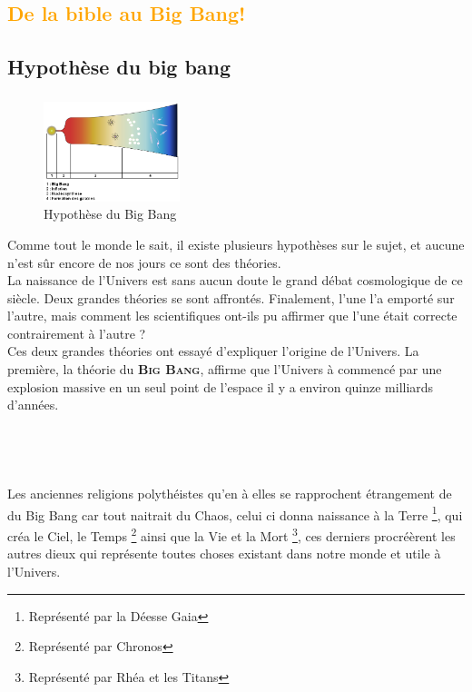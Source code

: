 \textcolor{orange}{\chapter{De la bible au Big Bang!}}
\section{Hypothèse du big bang}
\paragraph{}
	\begin{figure}
	\includegraphics[width=150px]{img3.png}
	\caption{Hypothèse du Big Bang}
\end{figure}
Comme tout le monde le sait, il existe plusieurs hypothèses sur le sujet, 
et aucune n'est sûr encore de nos jours ce sont des théories. \\
La naissance de l'Univers est sans aucun doute le grand débat cosmologique de ce 
siècle. Deux grandes théories se sont affrontés. Finalement, l'une l'a emporté 
sur l'autre, mais comment les scientifiques ont-ils pu affirmer que l'une était 
correcte contrairement à l'autre ?\\
Ces deux grandes théories ont essayé d'expliquer l'origine de l'Univers. 
La première, la théorie du \textbf{\textsc{Big Bang}}, affirme que l'Univers à 
commencé par une explosion massive en un seul point de l'espace il y a environ 
quinze milliards d'années.\\ \\ \\ \\ \\

Les anciennes religions polythéistes qu'en à elles se rapprochent étrangement de
du Big Bang car tout naitrait du Chaos, celui ci donna naissance à la Terre
\footnote{Représenté par la Déesse Gaia}, qui créa le Ciel, le Temps
\footnote{Représenté par Chronos} ainsi que la Vie et la Mort
\footnote{Représenté par Rhéa et les Titans}, ces derniers procréèrent les 
autres dieux qui représente toutes choses existant dans notre monde et utile 
à l'Univers.

